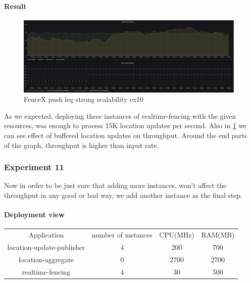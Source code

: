 \documentclass[a4]{report}
\begin{document}
    \paragraph{Result}
    \begin{figure}[ht]
        \caption{FenceX push leg strong scalability ex10}
        \label{fig:ex10}
        \includegraphics[scale=0.4]{images/evaluation/ex10-benchmarking-ongoing-2per4sec.png}
    \end{figure}
    As we expected, deploying three instances of realtime-fencing with the given resources, was enough to process 15K
    location updates per second.
    Also in \ref{fig:ex10} we can see effect of buffered location updates on throughput.
    Around the end parts of the graph, throughput is higher than input rate.

    \subsubsection{Experiment 11}
    Now in order to be just sure that adding more instances, won't affect the throughput in any good or bad way, we
    add another instance as the final step.

    \paragraph{Deployment view}
    \begin{center}
        \begin{tabular}{ c c c c }
            Application               & number of instances & CPU(MHz) & RAM(MB) \\
            location-update-publisher & 4                   & 200      & 700     \\
            location-aggregate        & 0                   & 2700     & 2700    \\
            realtime-fencing          & 4                   & 30       & 500     \\
        \end{tabular}
    \end{center}
\end{document}
